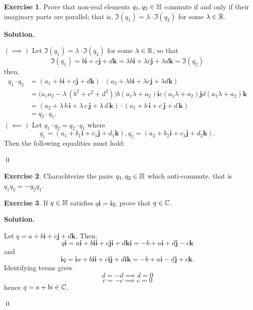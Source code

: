 \documentclass[12pt]{book}
\theoremstyle{definition}
\newtheorem{exercise}{Exercise}[chapter]
\newenvironment{solution}
{%
  \par\noindent\textbf{Solution.}\quad
}
{%
  \qed\par
}
\begin{document}
\begin{exercise}
  Prove that non-real elements $q_1, q_2 \in \mathbb{H}$ commute if and only if their imaginary parts are parallel; that is, $\Im(q_1) = \lambda \cdot \Im(q_2)$ for some $\lambda \in \mathbb{R}$.
\end{exercise}

\begin{solution}
  $(\implies)$ Let $\Im(q_1) = \lambda \cdot \Im(q_2)$ for some $\lambda \in \mathbb{R}$, so that
  \[
    \Im(q_1) = b\mathbf{i} + c\mathbf{j} + d\mathbf{k} = \lambda b\mathbf{i} + \lambda c\mathbf{j} + \lambda d\mathbf{k} = \Im(q_2)
  \]
  then,
  \[
  \begin{aligned}
    q_1 \cdot q_2 &= (a_1 + b\mathbf{i} + c\mathbf{j} + d\mathbf{k})\cdot (a_2 + \lambda b\mathbf{i} + \lambda c\mathbf{j} + \lambda d \mathbf{k}) 
    \\
    &=
    \bigl(a_1 a_2 - \lambda\,(b^2 + c^2 + d^2)\bigr)
    b(a_1 \lambda + a_2)\mathbf{i}
    c(a_1 \lambda + a_2)\mathbf{j}
    d(a_1 \lambda + a_2)\mathbf{k} \\
    &= 
    (a_2 + \lambda\,b\,\mathbf{i} + \lambda\,c\,\mathbf{j} + \lambda\,d\,\mathbf{k}) 
    \cdot (a_1 + b\,\mathbf{i} + c\,\mathbf{j} + d\,\mathbf{k}) \\
    &= q_2 \cdot q_1.
    \end{aligned}
  \]
  $(\impliedby)$ Let $q_1 \cdot q_2 = q_2 \cdot q_1$ where
  \[
    q_1 = (a_1 + b_1\mathbf{i} + c_1\mathbf{j} + d_1\mathbf{k}), q_2 = (a_2 + b_2\mathbf{i} + c_2\mathbf{j} + d_2\mathbf{k}).
  \]
  Then the following equalities must hold:

\end{solution}

\begin{exercise}
  Charachterize the pairs $q_1, q_2 \in \mathbb{H}$ which anti-commute, that is $q_1q_2 = -q_2q_1$.
\end{exercise}

\begin{exercise}
  If $q \in \mathbb{H}$ satisfies $q\mathbf{i} = \mathbf{i}q$, prove that $q \in \mathbb{C}$.
\end{exercise}
\begin{solution}
  Let $q = a + b\mathbf{i} + c\mathbf{j} + d\mathbf{k}$. Then,
  \[
    q\mathbf{i} = a\mathbf{i} + b\mathbf{i}\mathbf{i} + c\mathbf{j}\mathbf{i} + d\mathbf{k}\mathbf{i} = -b + a\mathbf{i} + d\mathbf{j} - c\mathbf{k}
  \]
  and
  \[
    \mathbf{i}q = \mathbf{i}a + b\mathbf{i}\mathbf{i} + c\mathbf{i}\mathbf{j} + d\mathbf{i}\mathbf{k} = -b + a\mathbf{i} - d\mathbf{j} + c\mathbf{k}.
  \]
  Identifying terms gives
  \[
  d = -d \implies d = 0 
  \]
  \[
  c = -c \implies c = 0
  \]
  hence $q = a+bi \in \mathbb{C}$.

\end{solution}
\end{document}
